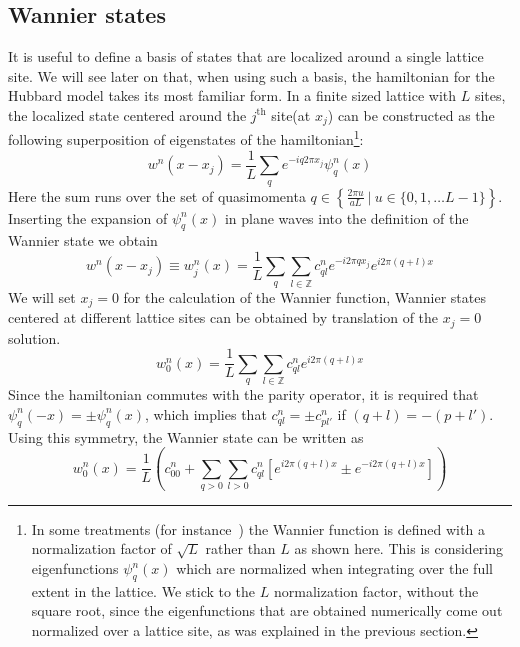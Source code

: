 \documentclass[oneside,11pt]{memoir}
\begin{document}
\subsection{Wannier states} 
\label{sec:1Dlattice}

It is useful to define a basis of states that are localized around a single
lattice site.  We will see later on that, when using such a basis, the
hamiltonian for the Hubbard model takes its most familiar form.  In a finite
sized lattice with $L$ sites,  the localized state centered around the
$j^{\text{th}}$ site(at $x_{j}$) can be constructed as the following
superposition of eigenstates of the hamiltonian\footnote{In some treatments
(for instance~\cite{salomon2013many}) the Wannier function is defined with a
normalization factor of $\sqrt{L}$  rather than $L$ as shown here.   This is
considering eigenfunctions $\psi_{q}^{n}(x)$ which are normalized when
integrating over the full extent in the lattice.  We stick to the $L$
normalization factor, without the square root, since the eigenfunctions that
are obtained numerically come out normalized over a lattice site, as was
explained in the previous section.}: 
\begin{equation} w^{n}(x-x_{j}) =  \frac{1}{L} \sum_{q}  e^{-i q 2\pi x_{j} }
\psi_{q}^{n}(x) \label{eq:wannier} \end{equation} Here the sum runs over the
set of quasimomenta  $q \in \left\lbrace \frac{2\pi u}{a L} \ |\  u \in \lbrace
0,1,\ldots L-1 \rbrace \right\rbrace$.  Inserting the expansion of
$\psi_{q}^{n}(x)$ in plane waves into the definition of the Wannier state we
obtain 
\begin{equation}
 w^{n}(x-x_{j}) \equiv w_{j}^{n}(x)= 
    \frac{1}{L} \sum_{q}  
   \sum_{l \in \mathbb{Z}} 
   c_{ql}^{n} 
   e^{-i 2\pi q x_{j} }  
   e^{i 2\pi(q+l)x} 
\end{equation}
We will set $x_{j}=0$ for the calculation of the Wannier function,   Wannier
states centered at different lattice sites can be obtained by translation of
the $x_{j}=0$ solution. 
\begin{equation}
  w_{0}^{n}(x)= 
    \frac{1}{L} \sum_{q}  
   \sum_{l \in \mathbb{Z}} 
   c_{ql}^{n} 
   e^{i 2\pi(q+l)x} 
\end{equation}
Since the hamiltonian commutes with the parity operator, it is required that
$\psi_{q}^{n}(-x) = \pm \psi_{q}^{n}(x)$, which implies that $c_{ql}^{n} = \pm
c_{pl'}^{n}$ if  $(q+l) = -(p+l')$.  Using this symmetry, the Wannier state
can be written as 
\begin{equation}
  w_{0}^{n}(x)= 
    \frac{1}{L} \left(
   c_{00}^{n} + 
    \sum_{q>0} 
   \sum_{l > 0 } 
   c_{ql}^{n} \left[ e^{i 2\pi(q+l)x} \pm e^{-i 2\pi(q+l)x } \right] \right)
\end{equation}
\end{document}
